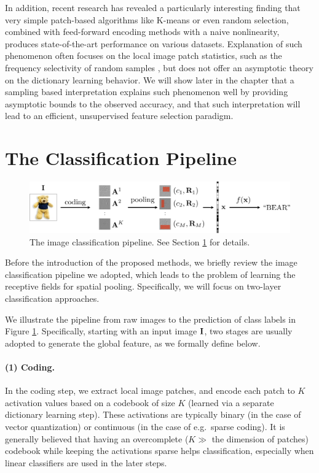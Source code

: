 In addition, recent research has revealed a particularly interesting finding \cite{coates2010aistats, Rigamonti:2011uc, coates2011icml, saxe2011random} that very simple patch-based algorithms like K-means or even random selection, combined with feed-forward encoding methods with a naive nonlinearity, produces state-of-the-art performance on various datasets. Explanation of such phenomenon often focuses on the local image patch statistics, such as the frequency selectivity of random samples \cite{saxe2011random}, but does not offer an asymptotic theory on the dictionary learning behavior. We will show later in the chapter that a \nystrom sampling based interpretation explains such phenomenon well by providing asymptotic bounds to the observed accuracy, and that such interpretation will lead to an efficient, unsupervised feature selection paradigm.

\section{The Classification Pipeline}\label{sec:pipeline}

\begin{figure}[t]
  \centering
  \includegraphics[width=1.\textwidth]{figs/smartpooling/pipeline_cvpr.pdf}
  \caption{The image classification pipeline. See Section \ref{sec:pipeline} for details.}\label{fig:pipeline}
  \vspace{-0.15in}
\end{figure}

Before the introduction of the proposed methods, we briefly review the image classification pipeline we adopted, which leads to the problem of learning the receptive fields for spatial pooling. Specifically, we will focus on two-layer classification approaches.

We illustrate the pipeline from raw images to the prediction of class labels in Figure \ref{fig:pipeline}. Specifically, starting with an input image $\mathbf{I}$, two stages are usually adopted to generate the global feature, as we formally define below.

\paragraph{(1) Coding.} In the coding step, we extract local image patches, and encode each patch to $K$ activation values based on a codebook of size $K$ (learned via a separate dictionary learning step). These activations are typically binary (in the case of vector quantization) or continuous (in the case of e.g.\ sparse coding). It is generally believed that having an overcomplete ($K \gg$ the dimension of patches) codebook while keeping the activations sparse helps classification, especially when linear classifiers are used in the later steps.


